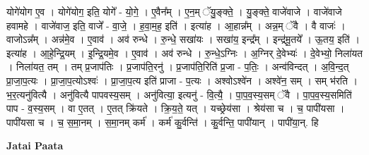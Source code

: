 \documentclass[17pt]{extarticle}
\begin{document}
योगे॑योग ए॒व । योगे॑योग॒ इति॒ योगे᳚ - यो॒गे॒ । ए॒वैन᳚म् । ए॒न॒म् ॅयु॒ङ्क्ते॒ । यु॒ङ्क्ते॒ वाजे॑वाजे । वाजे॑वाजे हवामहे । वाजे॑वाज॒ इति॒ वाजे᳚ - वा॒जे॒ । ह॒वा॒म॒ह॒ इति॑ । इत्या॑ह । आ॒हान्न᳚म् । अन्न॒म् ॅवै । वै वाजः॑ । वाजोऽन्न᳚म् । अन्न॑मे॒व । ए॒वाव॑ । अव॑ रुन्धे । रु॒न्धे॒ सखा॑यः । सखा॑य॒ इन्द्र᳚म् । इन्द्र॑मू॒तये᳚ । ऊ॒तय॒ इति॑ । इत्या॑ह । आ॒हे॒न्द्रि॒यम् । इ॒न्द्रि॒यमे॒व । ए॒वाव॑ । अव॑ रुन्धे । रु॒न्धे॒ऽग्निः । अ॒ग्निर् दे॒वेभ्यः॑ । दे॒वेभ्यो॒ निला॑यत । निला॑यत॒ तम् । तम् प्र॒जाप॑तिः । प्र॒जाप॑ति॒रनु॑ । प्र॒जाप॑ति॒रिति॑ प्र॒जा - प॒तिः॒ । अन्व॑विन्दत् । अ॒वि॒न्द॒त् प्रा॒जा॒प॒त्यः । प्रा॒जा॒प॒त्योऽश्वः॑ । प्रा॒जा॒प॒त्य इति॑ प्राजा - प॒त्यः । अश्वोऽश्वे॑न । अश्वे॑न॒ सम् । सम् भ॑रति । भ॒र॒त्यनु॑वित्यै । अनु॑वित्यै पापवस्य॒सम् । अनु॑वित्या॒ इत्यनु॑ - वि॒त्यै॒ । पा॒प॒व॒स्य॒सम् ॅवै । पा॒प॒व॒स्य॒समिति॑ पाप - व॒स्य॒सम् । वा ए॒तत् । ए॒तत् क्रि॑यते । क्रि॒य॒ते॒ यत् । यच्छ्रेय॑सा । श्रेय॑सा च । च॒ पापी॑यसा । पापी॑यसा च । च॒ स॒मा॒नम् । स॒मा॒नम् कर्म॑ । कर्म॑ कु॒र्वन्ति॑ । कु॒र्वन्ति॒ पापी॑यान् । पापी॑या॒न्. हि \newline

\textbf{Jatai Paata} \newline
\end{document}
